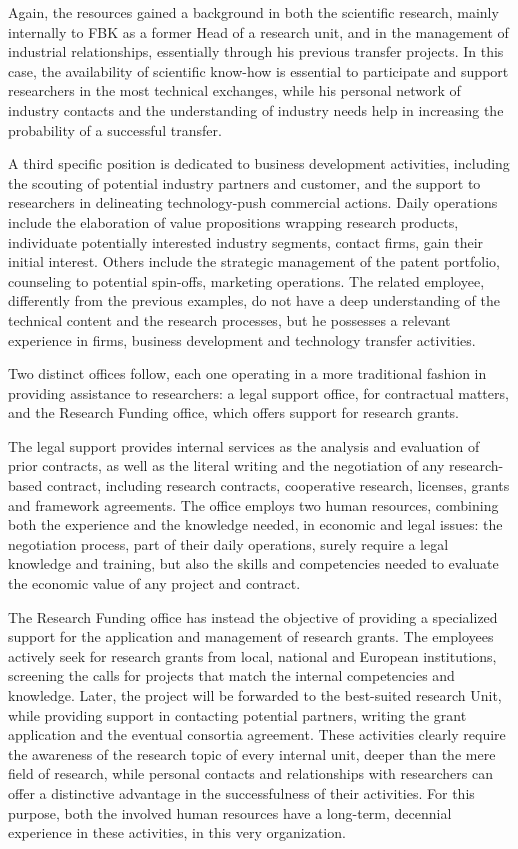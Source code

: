 Again, the resources gained a background in both the scientific research, mainly internally to FBK as a former Head of a research unit, and in the management of industrial relationships, essentially through his previous transfer projects. In this case, the availability of scientific know-how is essential to participate and support researchers in the most technical exchanges, while his personal network of industry contacts and the understanding of industry needs help in increasing the probability of a successful transfer.

A third specific position is dedicated to business development activities, including the scouting of potential industry partners and customer, and the support to researchers in delineating technology-push commercial actions. Daily operations include the elaboration of value propositions wrapping research products, individuate potentially interested industry segments, contact firms, gain their initial interest. Others include the strategic management of the patent portfolio, counseling to potential spin-offs, marketing operations. The related employee, differently from the previous examples, do not have a deep understanding of the technical content and the research processes, but he possesses a relevant experience in firms, business development and technology transfer activities.

Two distinct offices follow, each one operating in a more traditional fashion in providing assistance to researchers: a legal support office, for contractual matters, and the Research Funding office, which offers support for research grants.

The legal support provides internal services as the analysis and evaluation of prior contracts, as well as the literal writing and the negotiation of any research-based contract, including research contracts, cooperative research, licenses, grants and framework agreements. The office employs two human resources, combining both the experience and the knowledge needed, in economic and legal issues: the negotiation process, part of their daily operations, surely require a legal knowledge and training, but also the skills and competencies needed to evaluate the economic value of any project and contract. 

The Research Funding office has instead the objective of providing a specialized support for the application and management of research grants. The employees actively seek for research grants from local, national and European institutions, screening the calls for projects that match the internal competencies and knowledge. Later, the project will be forwarded to the best-suited research Unit, while providing support in contacting potential partners, writing the grant application and the eventual consortia agreement. These activities clearly require the awareness of the research topic of every internal unit, deeper than the mere field of research, while personal contacts and relationships with researchers can offer a distinctive advantage in the successfulness of their activities. For this purpose, both the involved human resources have a long-term, decennial experience in these activities, in this very organization.

